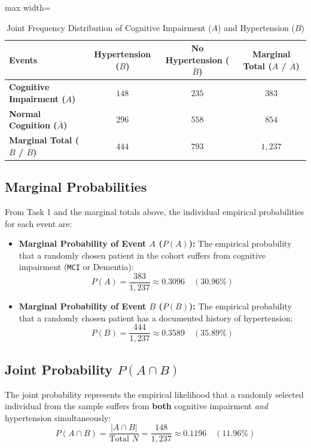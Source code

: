 \documentclass[11pt, a4paper]{article}
\begin{document}
\begin{table}[H]
\centering
\caption{Joint Frequency Distribution of Cognitive Impairment ($A$) and Hypertension ($B$)}
\label{tab:task2_contingency}
\begin{adjustbox}{max width=\textwidth}
\small
\begin{tabular}{lccc}
\toprule
\textbf{Events} & \textbf{Hypertension ($B$)} & \textbf{No Hypertension ($\overline{B}$)} & \textbf{Marginal Total ($A$ / $\overline{A}$)} \\
\midrule
\textbf{Cognitive Impairment ($A$)} & $148$ & $235$ & \textbf{$383$} \\
\textbf{Normal Cognition ($\overline{A}$)} & $296$ & $558$ & \textbf{$854$} \\
\midrule
\textbf{Marginal Total ($B$ / $\overline{B}$)} & \textbf{$444$} & \textbf{$793$} & \textbf{$1,237$} \\
\bottomrule
\end{tabular}
\end{adjustbox}
\end{table}

\subsection{Marginal Probabilities}
From Task 1 and the marginal totals above, the individual empirical probabilities for each event are:
\begin{itemize}
    \item \textbf{Marginal Probability of Event $A$ ($P(A)$):} The empirical probability that a randomly chosen patient in the cohort suffers from cognitive impairment (\texttt{MCI} or Dementia):
    \[
    P(A) = \frac{383}{1,237} \approx 0.3096 \quad (30.96\%)
    \]
    \item \textbf{Marginal Probability of Event $B$ ($P(B)$):} The empirical probability that a randomly chosen patient has a documented history of hypertension:
    \[
    P(B) = \frac{444}{1,237} \approx 0.3589 \quad (35.89\%)
    \]
\end{itemize}

\subsection{Joint Probability $P(A \cap B)$}
The joint probability represents the empirical likelihood that a randomly selected individual from the sample suffers from \textbf{both} cognitive impairment \textit{and} hypertension simultaneously:
\[
P(A \cap B) = \frac{|A \cap B|}{\text{Total } N} = \frac{148}{1,237} \approx 0.1196 \quad (11.96\%)
\]
\end{document}
